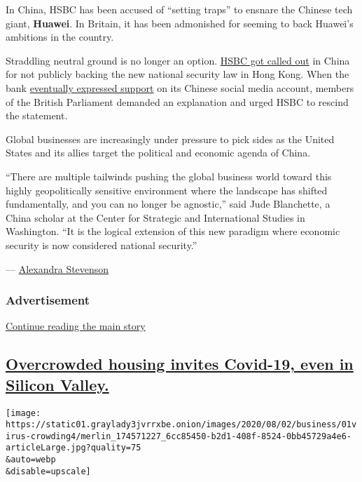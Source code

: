 In China, HSBC has been accused of ``setting traps'' to ensnare the
Chinese tech giant, \textbf{Huawei}. In Britain, it has been admonished
for seeming to back Huawei's ambitions in the country.

Straddling neutral ground is no longer an option.
\href{https://www.nytimes3xbfgragh.onion/2020/05/31/business/hong-kong-china-business.html}{HSBC
got called out} in China for not publicly backing the new national
security law in Hong Kong. When the bank
\href{https://www.nytimes3xbfgragh.onion/2020/06/03/business/china-hong-kong-damage.html}{eventually
expressed support} on its Chinese social media account, members of the
British Parliament demanded an explanation and urged HSBC to rescind the
statement.

Global businesses are increasingly under pressure to pick sides as the
United States and its allies target the political and economic agenda of
China.

``There are multiple tailwinds pushing the global business world toward
this highly geopolitically sensitive environment where the landscape has
shifted fundamentally, and you can no longer be agnostic,'' said Jude
Blanchette, a China scholar at the Center for Strategic and
International Studies in Washington. ``It is the logical extension of
this new paradigm where economic security is now considered national
security.''

---
\href{https://www.nytimes3xbfgragh.onion/by/alexandra-stevenson}{Alexandra
Stevenson}

\hypertarget{advertisement-2}{%
\subsubsection{Advertisement}\label{advertisement-2}}

\protect\hyperlink{after-dfp-ad-mid3}{Continue reading the main story}

\hypertarget{overcrowded-housing-invites-covid-19-even-in-silicon-valley}{%
\subsection{\texorpdfstring{\protect\hyperlink{overcrowded-housing-invites-covid-19-even-in-silicon-valley}{Overcrowded
housing invites Covid-19, even in Silicon
Valley.}}{Overcrowded housing invites Covid-19, even in Silicon Valley.}}\label{overcrowded-housing-invites-covid-19-even-in-silicon-valley}}

\texttt{[image: https://static01.graylady3jvrrxbe.onion/images/2020/08/02/business/01virus-crowding4/merlin\_174571227\_6cc85450-b2d1-408f-8524-0bb45729a4e6-articleLarge.jpg?quality=75\\\&auto=webp\\\&disable=upscale]}

